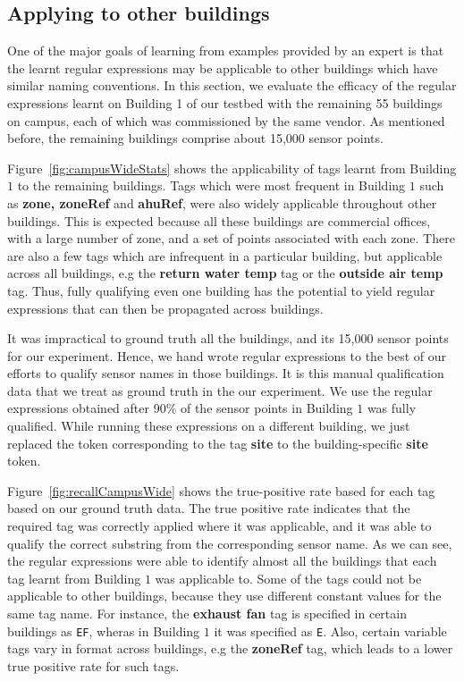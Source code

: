 \subsection{Applying to other buildings}

One of the major goals of learning from examples provided by an expert is that the learnt regular expressions may be applicable to other buildings which have similar naming conventions. In this section, we evaluate the efficacy of the regular expressions learnt on Building 1 of our testbed with the remaining 55 buildings on campus, each of which was commissioned by the same vendor. As mentioned before, the remaining buildings comprise about 15,000 sensor points.

Figure~\ref{fig:campusWideStats} shows the applicability of tags learnt from Building $1$ to the remaining buildings. Tags which were most frequent in Building $1$ such as {\bf zone, zoneRef} and {\bf ahuRef}, were also widely applicable throughout other buildings. This is expected because all these buildings are commercial offices, with a large number of zone, and a set of points associated with each zone. There are also a few tags which are infrequent in a particular building, but applicable across all buildings, e.g the {\bf return water temp} tag or the {\bf outside air temp} tag. Thus, fully qualifying even one building has the potential to yield regular expressions that can then be propagated across buildings.

It was impractical to ground truth all the buildings, and its 15,000 sensor points for our experiment. Hence, we hand wrote regular expressions to the best of our efforts to qualify sensor names in those buildings. It is this manual qualification data that we treat as ground truth in the our experiment. We use the regular expressions obtained after 90\% of the sensor points in Building $1$ was fully qualified. While running these expressions on a different building, we just replaced the token corresponding to the tag {\bf site} to the building-specific {\bf site}  token. 

Figure~\ref{fig:recallCampusWide} shows the true-positive rate based for each tag based on our ground truth data. The true positive rate indicates that the required tag was correctly applied where it was applicable, and it was able to qualify the correct substring from the corresponding sensor name. As we can see, the regular expressions were able to identify almost all the buildings that each tag learnt from Building $1$ was applicable to. Some of the tags could not be applicable to other buildings, because they use different constant values for the same tag name. For instance, the {\bf exhaust fan} tag is specified in certain buildings as \texttt{EF}, wheras in Building $1$ it was specified as \texttt{E}. Also, certain variable tags vary in format across buildings, e.g the {\bf zoneRef} tag, which leads to a lower true positive rate for such tags. 

